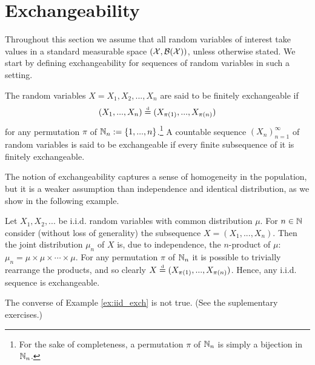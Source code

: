 

\section{Exchangeability}


Throughout this section we assume that all random variables of interest take values in a standard measurable space $(\mathcal{X}, \mathcal{B}(\mathcal{X}))$, unless otherwise stated. We start by defining exchangeability for sequences of random variables in such a setting.

\begin{definition}[Exchangeability] \label{def:exchangeability}
	The random variables $X = X_1, X_2, ..., X_n$ are said to be finitely exchangeable if
	\begin{equation*}
		(X_1, ..., X_n) \stackrel{\text{\rm\tiny d}}{=} (X_{\pi(1)}, ..., X_{\pi(n)})
	\end{equation*}
	for any permutation $\pi$ of $\mathbb{N}_n :=\{1, ..., n \}$.\footnote{For the sake of completeness, a permutation $\pi$ of $\mathbb{N}_n$ is simply a bijection in $\mathbb{N}_n$.} A countable sequence $(X_n)_{n=1}^{\infty}$ of random variables is said to be exchangeable if every finite subsequence of it is finitely exchangeable.
\end{definition}

The notion of exchangeability captures a sense of homogeneity in the population, but it is a weaker assumption than independence and identical distribution, as we show in the following example.


\begin{mdframed}[backgroundcolor=mygray] 
	\begin{example} \label{ex:iid_exch}
		Let $X_1, X_2, ...$ be i.i.d. random variables with common distribution $\mu$. For $n \in \mathbb{N}$ consider (without loss of generality) the subsequence $X = (X_1, ..., X_n)$. Then the joint distribution $\mu_n$ of $X$ is, due to independence, the $n$-product of $\mu$: $\mu_n = \mu \times \mu \times \cdots \times \mu$. For any permutation $\pi$ of $\mathbb{N}_n$ it is possible to trivially rearrange the products, and so clearly $X \stackrel{\text{\rm\tiny d}}{=} (X_{\pi(1)}, ..., X_{\pi(n)})$. Hence, any i.i.d. sequence is exchangeable.
	\end{example}
\end{mdframed}

The converse of Example \ref{ex:iid_exch} is not true. (See the suplementary exercises.) \\


